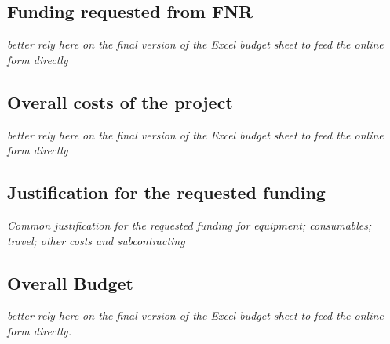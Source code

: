 % 

\subsection{Funding requested from FNR}
\emph{better rely here on the final version of the Excel budget sheet to feed
  the online form directly }

\subsection{Overall costs of the project}
\emph{better rely here on the final version of the Excel budget sheet to feed
  the online form directly }


\subsection{Justification for the requested funding}

\emph{Common justification for the requested funding for equipment; consumables; travel; other costs and subcontracting}


\subsection{Overall Budget}
\emph{better rely here on the final version of the Excel budget sheet to feed
  the online form directly.}







%
